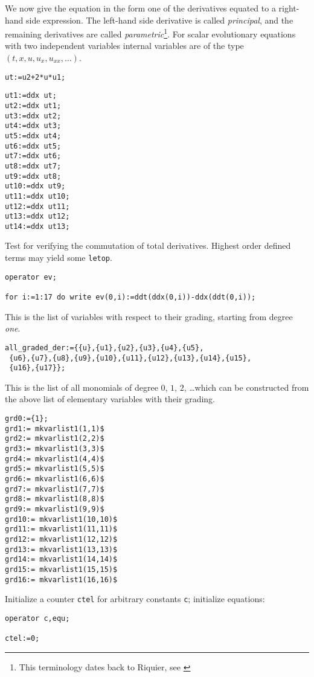 We now give the equation in the form one of the derivatives equated to a
right-hand side expression. The left-hand side derivative is called
\emph{principal}, and the remaining derivatives are called
\emph{parametric}\footnote{This terminology dates back to Riquier, see
  \cite{Mar}}.  For scalar
evolutionary equations with two independent variables internal variables are of
the type $(t,x,u,u_x,u_{xx},\ldots)$.
\begin{verbatim}
ut:=u2+2*u*u1;
\end{verbatim}

\begin{verbatim}
ut1:=ddx ut;
ut2:=ddx ut1;
ut3:=ddx ut2;
ut4:=ddx ut3;
ut5:=ddx ut4;
ut6:=ddx ut5;
ut7:=ddx ut6;
ut8:=ddx ut7;
ut9:=ddx ut8;
ut10:=ddx ut9;
ut11:=ddx ut10;
ut12:=ddx ut11;
ut13:=ddx ut12;
ut14:=ddx ut13;
\end{verbatim}

Test for verifying the commutation of total derivatives.
Highest order defined terms may yield some \texttt{letop}.
\begin{verbatim}
operator ev;

for i:=1:17 do write ev(0,i):=ddt(ddx(0,i))-ddx(ddt(0,i));
\end{verbatim}

This is the list of variables with respect to their grading,
starting from degree \emph{one}.
\begin{verbatim}
all_graded_der:={{u},{u1},{u2},{u3},{u4},{u5},
 {u6},{u7},{u8},{u9},{u10},{u11},{u12},{u13},{u14},{u15},
 {u16},{u17}};
\end{verbatim}

This is the list of all monomials of degree $0$, $1$, $2$, \dots which can be
constructed from the above list of elementary variables with their grading.
\begin{verbatim}
grd0:={1};
grd1:= mkvarlist1(1,1)$
grd2:= mkvarlist1(2,2)$
grd3:= mkvarlist1(3,3)$
grd4:= mkvarlist1(4,4)$
grd5:= mkvarlist1(5,5)$
grd6:= mkvarlist1(6,6)$
grd7:= mkvarlist1(7,7)$
grd8:= mkvarlist1(8,8)$
grd9:= mkvarlist1(9,9)$
grd10:= mkvarlist1(10,10)$
grd11:= mkvarlist1(11,11)$
grd12:= mkvarlist1(12,12)$
grd13:= mkvarlist1(13,13)$
grd14:= mkvarlist1(14,14)$
grd15:= mkvarlist1(15,15)$
grd16:= mkvarlist1(16,16)$
\end{verbatim}

Initialize a counter \texttt{ctel} for arbitrary constants \texttt{c};
initialize equations:
\begin{verbatim}
operator c,equ;

ctel:=0;
\end{verbatim}

